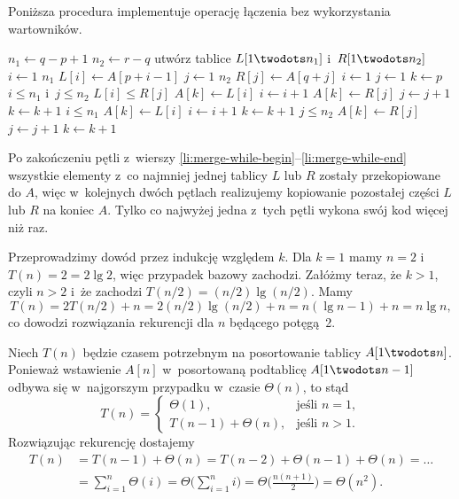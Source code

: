 \exercise %
Poniższa procedura implementuje operację łączenia bez wykorzystania wartowników.
\begin{codebox}
\li	$n_1\gets q-p+1$
\li	$n_2\gets r-q$
\li	utwórz tablice $L[1\twodots n_1]$ i~$R[1\twodots n_2]$
\li	\For $i\gets1$ \To $n_1$
\li		\Do
			$L[i]\gets A[p+i-1]$
		\End
\li	\For $j\gets1$ \To $n_2$
\li		\Do
			$R[j]\gets A[q+j]$
		\End
\li	$i\gets1$
\li	$j\gets1$
\li	$k\gets p$
\li	\While $i\le n_1$ i~$j\le n_2$ \label{li:merge-while-begin}
\li		\Do
			\If $L[i]\le R[j]$
\li				\Then
					$A[k]\gets L[i]$
\li					$i\gets i+1$
\li				\Else
					$A[k]\gets R[j]$
\li					$j\gets j+1$
				\End
\li			$k\gets k+1$
		\End \label{li:merge-while-end}
\li	\While $i\le n_1$
\li		\Do
			$A[k]\gets L[i]$
\li			$i\gets i+1$
\li			$k\gets k+1$
		\End
\li	\While $j\le n_2$
\li		\Do
			$A[k]\gets R[j]$
\li			$j\gets j+1$
\li			$k\gets k+1$
		\End
\end{codebox}
Po zakończeniu pętli  z~wierszy \ref{li:merge-while-begin}\nobreakdash--\ref{li:merge-while-end} wszystkie elementy z~co najmniej jednej tablicy $L$ lub $R$ zostały przekopiowane do $A$, więc w~kolejnych dwóch pętlach  realizujemy kopiowanie pozostałej części $L$ lub $R$ na koniec $A$. Tylko co najwyżej jedna z~tych pętli wykona swój kod więcej niż raz.

\exercise %
Przeprowadzimy dowód przez indukcję względem $k$. Dla $k=1$ mamy $n=2$ i~$T(n)=2=2\lg2$, więc przypadek bazowy zachodzi. Załóżmy teraz, że $k>1$, czyli $n>2$ i~że zachodzi $T(n/2)=(n/2)\lg(n/2)$. Mamy
\[
	T(n) = 2T(n/2)+n = 2(n/2)\lg(n/2)+n = n(\lg n-1)+n = n\lg n,
\]
co dowodzi rozwiązania rekurencji dla $n$ będącego potęgą~2.

\exercise %
Niech $T(n)$ będzie czasem potrzebnym na posortowanie tablicy $A[1\twodots n]$. Ponieważ wstawienie $A[n]$ w~posortowaną podtablicę $A[1\twodots n-1]$ odbywa się w~najgorszym przypadku w~czasie $\Theta(n)$, to stąd
\[
	T(n) =
	\begin{cases}
		\Theta(1), & \text{jeśli $n=1$}, \\
		T(n-1)+\Theta(n), & \text{jeśli $n>1$}.
	\end{cases}
\]
Rozwiązując rekurencję dostajemy
\begin{align*}
	T(n) &= T(n-1)+\Theta(n) = T(n-2)+\Theta(n-1)+\Theta(n) = \dots \\
	&= \sum_{i=1}^n\Theta(i) = \Theta\biggl(\sum_{i=1}^ni\biggr) = \Theta\biggl(\frac{n(n+1)}{2}\biggr) = \Theta(n^2).
\end{align*}

